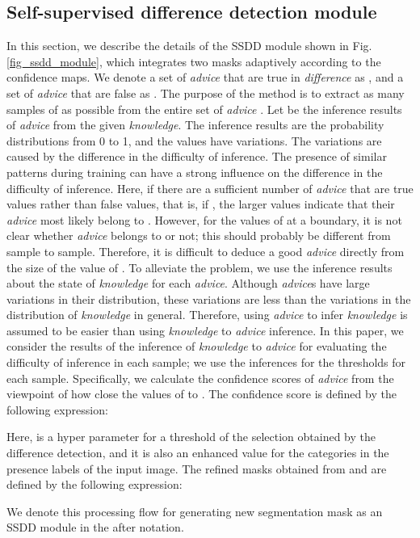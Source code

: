 \documentclass[10pt,twocolumn,letterpaper]{article}
\begin{document}
\subsection{Self-supervised difference detection module}
In this section, we describe the details of the SSDD module shown in Fig.\ref{fig_ssdd_module},
which integrates two masks adaptively according to the confidence maps.
We denote a set of {\it advice} that are true in {\it difference} as , and a set of {\it advice} that are false as .
The purpose of the method is to extract as many samples of  as possible from the entire set of {\it advice} . 
Let  be the inference results of {\it advice} from the given {\it knowledge}.
The inference results are the probability distributions from 0 to 1, and the values have variations.
The variations are caused by the difference in the difficulty of inference.
The presence of similar patterns during training can have a strong influence on the difference in the difficulty of inference. 
Here, if there are a sufficient number of {\it advice} that are true values rather than false values, that is, if , the larger values indicate that their {\it advice} most likely belong to .
However, for the values of  at a boundary, it is not clear whether {\it advice}  belongs to  or not; this should probably be different from sample to sample.
Therefore, it is difficult to deduce a good {\it advice} directly from the size of the value of .
To alleviate the problem, we use the inference results about the state of {\it knowledge} for each {\it advice}.
Although {\it advice}s have large variations in their distribution, these variations are less than the variations in the distribution of {\it knowledge} in general.
Therefore, using {\it advice} to infer {\it knowledge} is assumed to be easier than using {\it knowledge} to {\it advice} inference.
In this paper, we consider the results of the inference of {\it knowledge} to {\it advice} for evaluating the difficulty of inference in each sample; we use the inferences for the thresholds for each sample.
Specifically, we calculate the confidence scores of {\it advice}  from the viewpoint of how close the values of  to .
The confidence score  is defined by the following expression:

Here,  is a hyper parameter for a threshold of the selection obtained by the difference detection, and it is also an enhanced value for the categories in the presence labels of the input image.
The refined masks  obtained from  and  are defined by the following expression:

We denote this processing flow for generating new segmentation mask as an SSDD module in the after notation.
\end{document}
